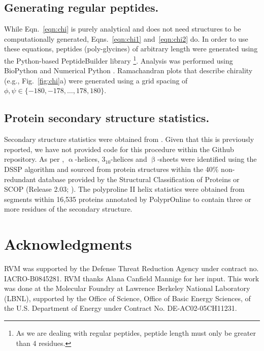 \documentclass[fleqn,10pt]{wlpeerj} %
\newcommand{\Fig}[1]{Fig.~\ref{#1}}
\newcommand{\Eqn}[1]{Eqn.~\ref{#1}}
\newcommand{\Eqns}[1]{Eqns.~\ref{#1}}
\begin{document}
\subsection*{Generating regular peptides.}
While \Eqn{eqn:chi} is purely analytical and does not need structures to be computationally generated, \Eqns{eqn:chi1} and~\ref{eqn:chi2} do. In order to use these equations, peptides (poly-glycines) of arbitrary length were generated using the Python-based PeptideBuilder library \citep{Matthew2013}\footnote{As we are dealing with regular peptides, peptide length must only be greater than 4 residues.}. Analysis was performed using BioPython \citep{Cock2009} and Numerical Python \citep{VanDerWalt2011}. Ramachandran plots that describe chirality (e.g., \Fig{fig:chi}a) were generated using a grid spacing of $\phi,\psi \in \{-180,-178,\ldots,178,180\}$.

\subsection*{Protein secondary structure statistics.} 
Secondary structure statistics were obtained from \cite{MannigeKunduWhitelam2016}. Given that this is previously reported, we have not provided code for this procedure within the Github repository. As per \cite{MannigeKunduWhitelam2016}, $\upalpha$-helices, $3_{10}$-helices and $\upbeta$-sheets were identified using the DSSP algorithm \citep{Zhao2005,Kabsch1983,Joosten2011} and sourced from protein structures within the 40\% non-redundant database provided by the Structural Classification of Proteins or SCOP (Release 2.03; \cite{Fox2014}). The polyproline II helix statistics were obtained from segments within 16,535 proteins annotated by PolyprOnline \citep{Chebrek2014} to contain three or more residues of the secondary structure.

\section*{Acknowledgments}

RVM was supported by the Defense Threat Reduction Agency under contract no. IACRO-B0845281. RVM thanks Alana Canfield Mannige for her input. This work was done at the Molecular Foundry at Lawrence Berkeley National Laboratory (LBNL), supported by the Office of Science, Office of Basic Energy Sciences, of the U.S. Department of Energy under Contract No. DE-AC02-05CH11231.


\end{document}

